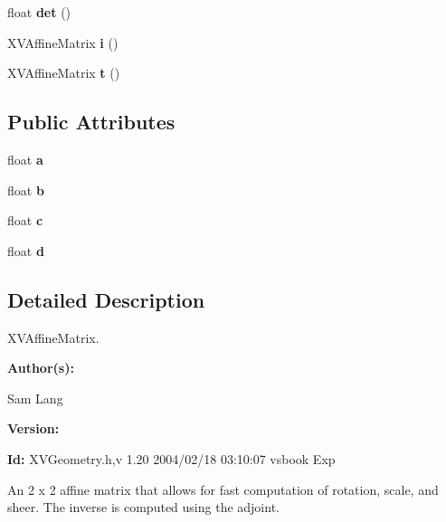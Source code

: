 \begin{CompactItemize}
\item 
\label{XVAffineMatrix_a9}
\hypertarget{class_XVAffineMatrix_a9}{
float {\bf det} ()}

\item 
\label{XVAffineMatrix_a10}
\hypertarget{class_XVAffineMatrix_a10}{
XVAffine\-Matrix {\bf i} ()}

\item 
\label{XVAffineMatrix_a11}
\hypertarget{class_XVAffineMatrix_a11}{
XVAffine\-Matrix {\bf t} ()}

\end{CompactItemize}
\subsection*{Public Attributes}
\begin{CompactItemize}
\item 
float {\bf a}
\item 
float {\bf b}
\item 
float {\bf c}
\item 
float {\bf d}
\end{CompactItemize}


\subsection{Detailed Description}
XVAffine\-Matrix.

\begin{Desc}
\item[{\bf Author(s): }]\par
 Sam Lang \end{Desc}
\begin{Desc}
\item[{\bf Version: }]\par
 \end{Desc}
\begin{Desc}
\item[{\bf Id: }] XVGeometry.h,v 1.20 2004/02/18 03:10:07 vsbook Exp \end{Desc}


An 2 x 2 affine matrix that allows for fast computation of rotation, scale, and sheer. The inverse is computed using the adjoint. 




